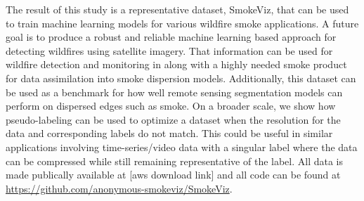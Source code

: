 \documentclass{article}
\begin{document}
The result of this study is a representative dataset, SmokeViz, that can be used to train machine learning models for various wildfire smoke applications. A future goal is to produce a robust and reliable machine learning based approach for detecting wildfires using satellite imagery. That information can be used for wildfire detection and monitoring in along with a highly needed smoke product for data assimilation into smoke dispersion models. Additionally, this dataset can be used as a benchmark for how well remote sensing segmentation models can perform on dispersed edges such as smoke. On a broader scale, we show how pseudo-labeling can be used to optimize a dataset when the resolution for the data and corresponding labels do not match. This could be useful in similar applications involving time-series/video data with a singular label where the data can be compressed while still remaining representative of the label. All data is made publically available at [aws download link] and all code can be found at \url{https://github.com/anonymous-smokeviz/SmokeViz}.




\end{document}
